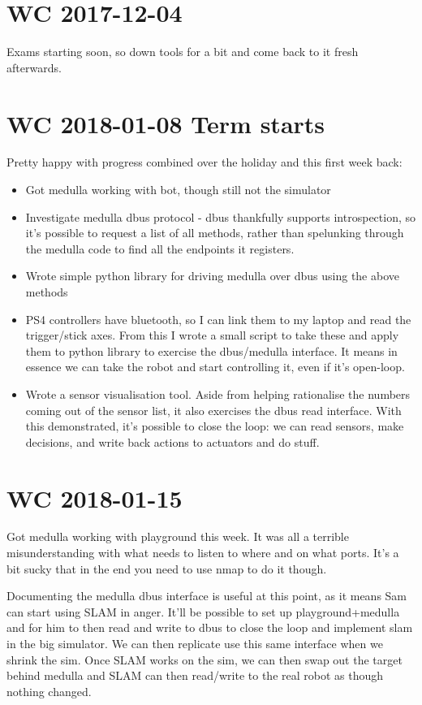 \documentclass[a4paper]{article}
\begin{document}
\section{WC 2017-12-04}
    Exams starting soon, so down tools for a bit and come back to it fresh afterwards.

\section{WC 2018-01-08 Term starts}
    Pretty happy with progress combined over the holiday and this first week back:
    \begin{itemize}
        \item Got medulla working with bot, though still not the simulator
        \item Investigate medulla dbus protocol - dbus thankfully supports introspection, so it's possible to request a
            list of all methods, rather than spelunking through the medulla code to find all the endpoints it registers.
        \item Wrote simple python library for driving medulla over dbus using the above methods
        \item PS4 controllers have bluetooth, so I can link them to my laptop and read the trigger/stick axes. From this
            I wrote a small script to take these and apply them to python library to exercise the dbus/medulla
            interface. It means in essence we can take the robot and start controlling it, even if it's open-loop.
        \item Wrote a sensor visualisation tool. Aside from helping rationalise the numbers coming out of the sensor
            list, it also exercises the dbus read interface. With this demonstrated, it's possible to close the loop: we
            can read sensors, make decisions, and write back actions to actuators and do stuff.
    \end{itemize}
\section{WC 2018-01-15}
    Got medulla working with playground this week. It was all a terrible misunderstanding with what needs to listen to
    where and on what ports. It's a bit sucky that in the end you need to use nmap to do it though.

    Documenting the medulla dbus interface is useful at this point, as it means Sam can start using SLAM in anger. It'll
    be possible to set up playground+medulla and for him to then read and write to dbus to close the loop and implement
    slam in the big simulator. We can then replicate use this same interface when we shrink the sim. Once SLAM works on
    the sim, we can then swap out the target behind medulla and SLAM can then read/write to the real robot as though
    nothing changed.
\end{document}
